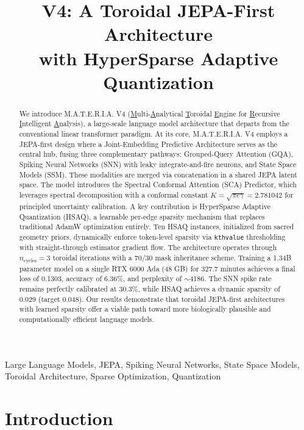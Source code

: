 \documentclass[conference]{IEEEtran}
\title{\materia{} V4: A Toroidal JEPA-First Architecture \\ with HyperSparse Adaptive Quantization}
\author{
  \IEEEauthorblockN{Method White}
  \IEEEauthorblockA{\textit{Xiaomi MiMo Team}\\
  methodwhite@xiaomi.com}
}
\newcommand{\materia}{\textsc{M.A.T.E.R.I.A.}}
\begin{document}
\maketitle

\begin{abstract}
We introduce \materia{} V4 (\underline{M}ulti-\underline{A}nalytical \underline{T}oroidal \underline{E}ngine for \underline{R}ecursive \underline{I}ntelligent \underline{A}nalysis), a large-scale language model architecture that departs from the conventional linear transformer paradigm. At its core, \materia{} V4 employs a JEPA-first design where a Joint-Embedding Predictive Architecture serves as the central hub, fusing three complementary pathways: Grouped-Query Attention (GQA), Spiking Neural Networks (SNN) with leaky integrate-and-fire neurons, and State Space Models (SSM). These modalities are merged via concatenation in a shared JEPA latent space. The model introduces the Spectral Conformal Attention (SCA) Predictor, which leverages spectral decomposition with a conformal constant $K = \sqrt{\pi e \gamma} = 2.781042$ for principled uncertainty calibration. A key contribution is HyperSparse Adaptive Quantization (HSAQ), a learnable per-edge sparsity mechanism that replaces traditional AdamW optimization entirely. Ten HSAQ instances, initialized from sacred geometry priors, dynamically enforce token-level sparsity via \texttt{kthvalue} thresholding with straight-through estimator gradient flow. The architecture operates through $n_{\text{cycles}}=3$ toroidal iterations with a 70/30 mask inheritance scheme. Training a 1.34B parameter model on a single RTX 6000 Ada (48 GB) for 327.7 minutes achieves a final loss of 0.1303, accuracy of 6.36\%, and perplexity of $\sim$4186. The SNN spike rate remains perfectly calibrated at 30.3\%, while HSAQ achieves a dynamic sparsity of 0.029 (target 0.048). Our results demonstrate that toroidal JEPA-first architectures with learned sparsity offer a viable path toward more biologically plausible and computationally efficient language models.
\end{abstract}

\begin{IEEEkeywords}
Large Language Models, JEPA, Spiking Neural Networks, State Space Models, Toroidal Architecture, Sparse Optimization, Quantization
\end{IEEEkeywords}

\section{Introduction}
\end{document}
